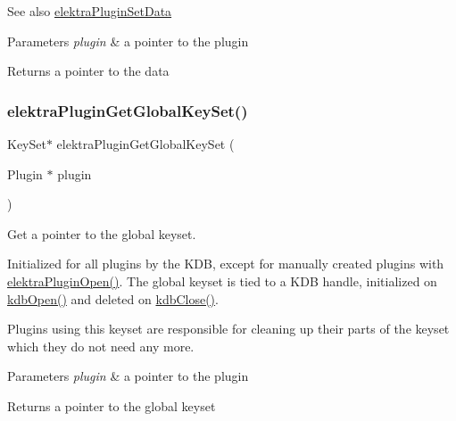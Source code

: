 \begin{DoxySeeAlso}{See also}
\hyperlink{group__plugin_gaf4b941a52ff55d0ca2a9158d90208ef2}{elektra\+Plugin\+Set\+Data} 
\end{DoxySeeAlso}

\begin{DoxyParams}{Parameters}
{\em plugin} & a pointer to the plugin \\
\hline
\end{DoxyParams}
\begin{DoxyReturn}{Returns}
a pointer to the data 
\end{DoxyReturn}
\mbox{\label{group__plugin_ga436cda13ed70c0face08661a90620bf6}} 
\subsubsection{\texorpdfstring{elektra\+Plugin\+Get\+Global\+Key\+Set()}{elektraPluginGetGlobalKeySet()}}
{\footnotesize\ttfamily Key\+Set$\ast$ elektra\+Plugin\+Get\+Global\+Key\+Set (\begin{DoxyParamCaption}\item[{Plugin $\ast$}]{plugin }\end{DoxyParamCaption})}



Get a pointer to the global keyset. 

Initialized for all plugins by the K\+DB, except for manually created plugins with {\ttfamily \hyperlink{elektra_2plugin_8c_a32a70a7876542c51d153164ac5108a57}{elektra\+Plugin\+Open()}}. The global keyset is tied to a K\+DB handle, initialized on {\ttfamily \hyperlink{group__kdb_ga6808defe5870f328dd17910aacbdc6ca}{kdb\+Open()}} and deleted on {\ttfamily \hyperlink{group__kdb_gadb54dc9fda17ee07deb9444df745c96f}{kdb\+Close()}}.

Plugins using this keyset are responsible for cleaning up their parts of the keyset which they do not need any more.


\begin{DoxyParams}{Parameters}
{\em plugin} & a pointer to the plugin \\
\hline
\end{DoxyParams}
\begin{DoxyReturn}{Returns}
a pointer to the global keyset 
\end{DoxyReturn}
\mbox{\label{group__plugin_gaf4b941a52ff55d0ca2a9158d90208ef2}} 
